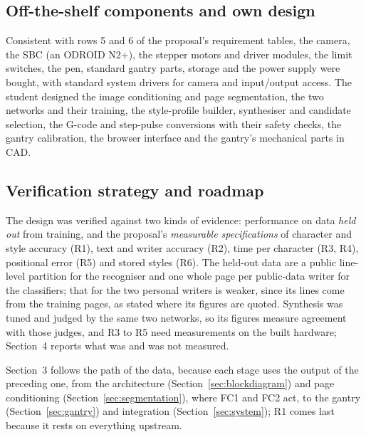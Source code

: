 \subsection{Off-the-shelf components and own design}
\label{sec:app-offshelf}

Consistent with rows 5 and 6 of the proposal's requirement tables, the camera, the SBC (an ODROID N2+), the stepper motors and driver modules, the limit switches, the pen, standard gantry parts, storage and the power supply were bought, with standard system drivers for camera and input/output access. The student designed the image conditioning and page segmentation, the two networks and their training, the style-profile builder, synthesiser and candidate selection, the G-code and step-pulse conversions with their safety checks, the gantry calibration, the browser interface and the gantry's mechanical parts in CAD. 

\subsection{Verification strategy and roadmap}
\label{sec:app-verification}

The design was verified against two kinds of evidence: performance on data \emph{held out} from training, and the proposal's \emph{measurable specifications} of character and style accuracy (R1), text and writer accuracy (R2), time per character (R3, R4), positional error (R5) and stored styles (R6). The held-out data are a public line-level partition for the recogniser and one whole page per public-data writer for the classifiers; that for the two personal writers is weaker, since its lines come from the training pages, as stated where its figures are quoted. Synthesis was tuned and judged by the same two networks, so its figures measure agreement with those judges, and R3 to R5 need measurements on the built hardware; Section~4 reports what was and was not measured.

Section~3 follows the path of the data, because each stage uses the output of the preceding one, from the architecture (Section~\ref{sec:blockdiagram}) and page conditioning (Section~\ref{sec:segmentation}), where FC1 and FC2 act, to the gantry (Section~\ref{sec:gantry}) and integration (Section~\ref{sec:system}); R1 comes last because it rests on everything upstream.
